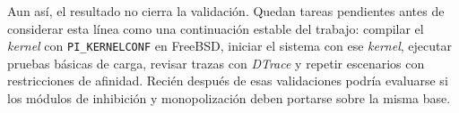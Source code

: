 Aun así, el resultado no cierra la validación. Quedan tareas pendientes antes de considerar esta línea como una continuación estable del trabajo: compilar el \textit{kernel} con \verb|PI_KERNELCONF| en FreeBSD, iniciar el sistema con ese \textit{kernel}, ejecutar pruebas básicas de carga, revisar trazas con \textit{DTrace} y repetir escenarios con restricciones de afinidad. Recién después de esas validaciones podría evaluarse si los módulos de inhibición y monopolización deben portarse sobre la misma base.\par
